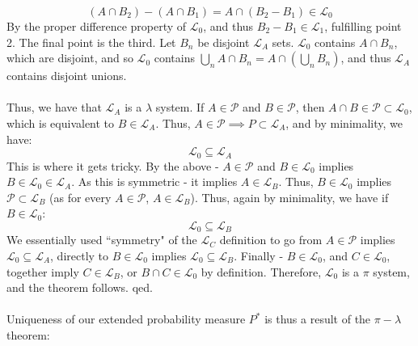 \documentclass[12pt,a4paper]{article}
\newcommand{\1}[1]{\mathbbm{1}\left\{ #1 \right\}}
\newcommand{\lcal}{\mathcal{L}}
\newcommand{\pcal}{\mathcal{P}}
\begin{document}
$$
	(A \cap B_2) - (A \cap B_1) = A \cap (B_2 - B_1) \in \lcal_0
$$
By the proper difference property of $\lcal_0$, and thus $B_2 - B_1 \in \lcal_1$, fulfilling point 2. The final point is the third. Let $B_n$ be disjoint $\lcal_A$ sets. $\lcal_0$ contains $A \cap B_n$, which are disjoint, and so $\lcal_0$ contains $\bigcup_n A \cap B_n = A \cap (\bigcup_n B_n)$, and thus $\lcal_A$ contains disjoint unions.
\\\\
Thus, we have that $\lcal_A$ is a $\lambda$ system. If $A \in \pcal$ and $B \in \pcal$, then $A \cap B \in \pcal \subset \lcal_0$, which is equivalent to $B \in \lcal_A$. Thus, $A \in \pcal \implies P \subset \lcal_A$, and by minimality, we have:
$$
	\lcal_0 \subseteq \lcal_A
$$
This is where it gets tricky. By the above - $A \in \pcal$ and $B \in \lcal_0$ implies $B \in \lcal_0 \in \lcal_A$. As this is symmetric - it implies $A \in \lcal_B$. Thus, $B \in \lcal_0$ implies $\pcal \subset \lcal_B$ (as for every $A \in \pcal$, $A \in \lcal_B$). Thus, again by minimality, we have if $B \in \lcal_0$:
$$
	\lcal_0 \subseteq \lcal_B
$$
We essentially used ``symmetry" of the $\lcal_C$ definition to go from $A \in \pcal$ implies $\lcal_0 \subseteq \lcal_A$, directly to $B \in \lcal_0$ implies $\lcal_0 \subseteq \lcal_B$. Finally - $B \in \lcal_0$, and $C \in \lcal_0$, together imply $C \in \lcal_B$, or $B \cap C \in \lcal_0$ by definition. Therefore, $\lcal_0$ is a $\pi$ system, and the theorem follows. qed.
\\\\
Uniqueness of our extended probability measure $P^*$ is thus a result of the $\pi-\lambda$ theorem:
\end{document}
